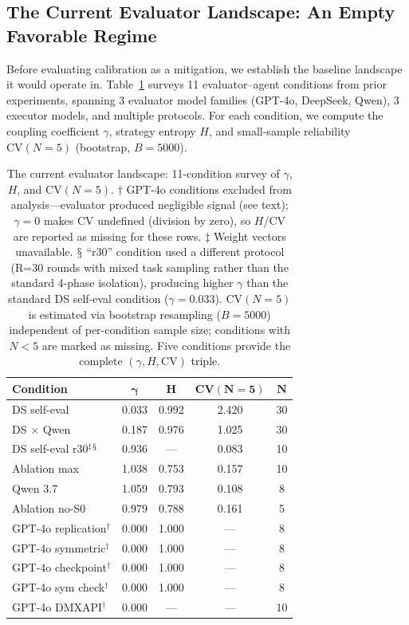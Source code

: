 \documentclass[11pt]{article}
\newcommand{\CV}{\ensuremath{\mathrm{CV}}}
\theoremstyle{definition}
\theoremstyle{remark}
\begin{document}
\subsection{The Current Evaluator Landscape: An Empty Favorable Regime}

Before evaluating calibration as a mitigation, we establish the baseline landscape it would operate in. Table~\ref{tab:landscape_survey} surveys 11 evaluator--agent conditions from prior experiments, spanning 3 evaluator model families (GPT-4o, DeepSeek, Qwen), 3 executor models, and multiple protocols. For each condition, we compute the coupling coefficient $\gamma$, strategy entropy $H$, and small-sample reliability $\CV(N{=}5)$ (bootstrap, $B{=}5000$).

\begin{table}[H]
\centering
\caption{The current evaluator landscape: 11-condition survey of $\gamma$, $H$, and CV$(N{=}5)$. $\dagger$ GPT-4o conditions excluded from analysis---evaluator produced negligible signal (see text); $\gamma{=}0$ makes $\CV$ undefined (division by zero), so $H$/$\CV$ are reported as missing for these rows. $\ddagger$ Weight vectors unavailable. $\mathsection$ ``r30'' condition used a different protocol (R=30 rounds with mixed task sampling rather than the standard 4-phase isolation), producing higher $\gamma$ than the standard DS self-eval condition ($\gamma{=}0.033$). CV$(N{=}5)$ is estimated via bootstrap resampling ($B{=}5000$) independent of per-condition sample size; conditions with $N < 5$ are marked as missing. Five conditions provide the complete $(\gamma, H, \CV)$ triple.}
\label{tab:landscape_survey}
\footnotesize
\begin{tabular}{@{}lcccc@{}}
\toprule
\textbf{Condition} & $\boldsymbol{\gamma}$ & $\boldsymbol{H}$ & $\textbf{CV}\boldsymbol{(N{=}5)}$ & $\boldsymbol{N}$ \\
\midrule
DS self-eval          & 0.033 & 0.992 & 2.420 & 30 \\
DS $\times$ Qwen      & 0.187 & 0.976 & 1.025 & 30 \\
DS self-eval r30$^\ddagger$$^\mathsection$ & 0.936 & ---   & 0.083 & 10 \\
Ablation max          & 1.038 & 0.753 & 0.157 & 10 \\
Qwen 3.7              & 1.059 & 0.793 & 0.108 & 8  \\
Ablation no-S0        & 0.979 & 0.788 & 0.161 & 5  \\
\midrule
GPT-4o replication$^\dagger$   & 0.000 & 1.000 & ---   & 8  \\
GPT-4o symmetric$^\dagger$     & 0.000 & 1.000 & ---   & 8  \\
GPT-4o checkpoint$^\dagger$    & 0.000 & 1.000 & ---   & 8  \\
GPT-4o sym check$^\dagger$     & 0.000 & 1.000 & ---   & 8  \\
GPT-4o DMXAPI$^\dagger$        & 0.000 & ---   & ---   & 10 \\
\bottomrule
\end{tabular}
\end{table}
\end{document}
